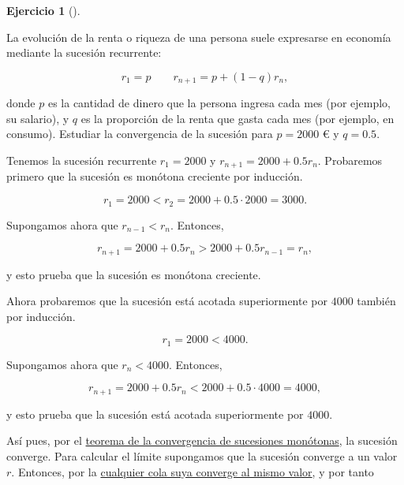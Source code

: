 \documentclass[
  spanish,
  a4paper,
]{scrreport}
\theoremstyle{definition}
\newtheorem{exercise}{Ejercicio}[chapter]
\theoremstyle{remark}
\begin{document}
\begin{exercise}[]\protect\hypertarget{exr-2}{}\label{exr-2}

La evolución de la renta o riqueza de una persona suele expresarse en
economía mediante la sucesión recurrente:

\[
r_1 = p \qquad r_{n+1} = p + (1-q) r_n,
\]

donde \(p\) es la cantidad de dinero que la persona ingresa cada mes
(por ejemplo, su salario), y \(q\) es la proporción de la renta que
gasta cada mes (por ejemplo, en consumo). Estudiar la convergencia de la
sucesión para \(p = 2000\) € y \(q = 0.5\).

\end{exercise}

\begin{tcolorbox}[enhanced jigsaw, arc=.35mm, bottomrule=.15mm, bottomtitle=1mm, breakable, colback=white, colbacktitle=quarto-callout-tip-color!10!white, colframe=quarto-callout-tip-color-frame, coltitle=black, left=2mm, leftrule=.75mm, opacityback=0, opacitybacktitle=0.6, rightrule=.15mm, title=\textcolor{quarto-callout-tip-color}{\faLightbulb}\hspace{0.5em}{Solución}, titlerule=0mm, toprule=.15mm, toptitle=1mm]

Tenemos la sucesión recurrente \(r_1 = 2000\) y
\(r_{n+1} = 2000 + 0.5 r_n\). Probaremos primero que la sucesión es
monótona creciente por inducción.

\[
r_1 = 2000 < r_2 = 2000 + 0.5 \cdot 2000 = 3000.
\]

Supongamos ahora que \(r_{n-1} < r_n\). Entonces,

\[
r_{n+1} = 2000 + 0.5 r_n > 2000 + 0.5 r_{n-1} = r_n,
\]

y esto prueba que la sucesión es monótona creciente.

Ahora probaremos que la sucesión está acotada superiormente por \(4000\)
también por inducción.

\[
r_1 = 2000 < 4000.
\]

Supongamos ahora que \(r_n < 4000\). Entonces,

\[
r_{n+1} = 2000 + 0.5 r_n < 2000 + 0.5 \cdot 4000 = 4000,
\]

y esto prueba que la sucesión está acotada superiormente por \(4000\).

Así pues, por el
\href{https://aprendeconalf.es/analisis-manual/04-sucesiones.html\#thm-convergencia-monotona}{teorema
de la convergencia de sucesiones monótonas}, la sucesión converge. Para
calcular el límite supongamos que la sucesión converge a un valor \(r\).
Entonces, por la
\href{https://aprendeconalf.es/analisis-manual/04-sucesiones.html\#prp-convergencia-cola-sucesion}{cualquier
cola suya converge al mismo valor}, y por tanto


\end{tcolorbox}
\end{document}
